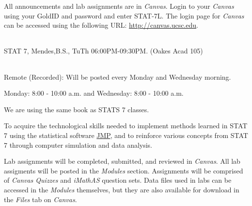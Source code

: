\documentclass[11pt]{article}
\begin{document}

 All announcements and lab assignments are in {\em Canvas}. Login to your {\em Canvas} using your GoldID and password and enter STAT-7L. 
The login page for {\em Canvas} can be accessed using the following URL: 
\url{http://canvas.ucsc.edu}.
\vspace{0.3in}

 \\
STAT 7, Mendes,B.S., TuTh 06:00PM-09:30PM. (Oakes Acad 105)

\vspace{.3in}

\\ 
Remote (Recorded): Will be posted every Monday and Wednesday morning.\\


Monday: 8:00 - 10:00 a.m.  and Wednesday: 8:00 - 10:00 a.m. \\


\vspace{.3in}



We are using the same book as STATS 7 classes.

\vspace{.3in}

 To acquire the technological skills
needed to implement methods learned in STAT 7 using the statistical
software \href{https://www.jmp.com/en_us/home.html}{JMP}, and to reinforce various concepts from STAT 7 through
computer simulation and data analysis.  \vspace{.2in}

 Lab assignments will be completed,
submitted, and reviewed in {\em Canvas}.  All lab assigments will be posted in the
{\em Modules} section. Assignments will be comprised of {\em Canvas Quizzes} and {\em iMathAS} 
question sets. Data files used in labs can be accessed in the {\em Modules} themselves, 
but they are also available for download in the {\em Files} tab on {\em Canvas}.
\end{document}
